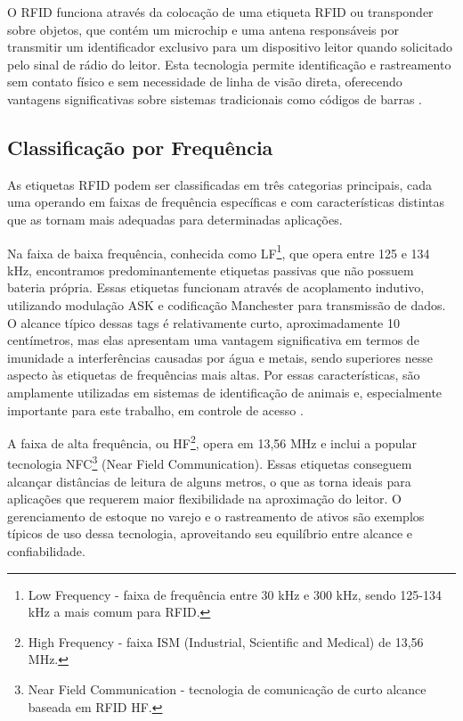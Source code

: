 O RFID funciona através da colocação de uma etiqueta RFID ou transponder sobre objetos, que contém um microchip e uma antena responsáveis por transmitir um identificador exclusivo para um dispositivo leitor quando solicitado pelo sinal de rádio do leitor. Esta tecnologia permite identificação e rastreamento sem contato físico e sem necessidade de linha de visão direta, oferecendo vantagens significativas sobre sistemas tradicionais como códigos de barras \cite{avery-dennison-rfid}.

\subsection{Classificação por Frequência}

As etiquetas RFID podem ser classificadas em três categorias principais, cada uma operando em faixas de frequência específicas e com características distintas que as tornam mais adequadas para determinadas aplicações.

Na faixa de baixa frequência, conhecida como LF\footnote{Low Frequency - faixa de frequência entre 30 kHz e 300 kHz, sendo 125-134 kHz a mais comum para RFID.}, que opera entre 125 e 134 kHz, encontramos predominantemente etiquetas passivas que não possuem bateria própria. Essas etiquetas funcionam através de acoplamento indutivo, utilizando modulação ASK e codificação Manchester para transmissão de dados. O alcance típico dessas tags é relativamente curto, aproximadamente 10 centímetros, mas elas apresentam uma vantagem significativa em termos de imunidade a interferências causadas por água e metais, sendo superiores nesse aspecto às etiquetas de frequências mais altas. Por essas características, são amplamente utilizadas em sistemas de identificação de animais e, especialmente importante para este trabalho, em controle de acesso \cite{avery-dennison-rfid}.

A faixa de alta frequência, ou HF\footnote{High Frequency - faixa ISM (Industrial, Scientific and Medical) de 13,56 MHz.}, opera em 13,56 MHz e inclui a popular tecnologia NFC\footnote{Near Field Communication - tecnologia de comunicação de curto alcance baseada em RFID HF.} (Near Field Communication). Essas etiquetas conseguem alcançar distâncias de leitura de alguns metros, o que as torna ideais para aplicações que requerem maior flexibilidade na aproximação do leitor. O gerenciamento de estoque no varejo e o rastreamento de ativos são exemplos típicos de uso dessa tecnologia, aproveitando seu equilíbrio entre alcance e confiabilidade.

